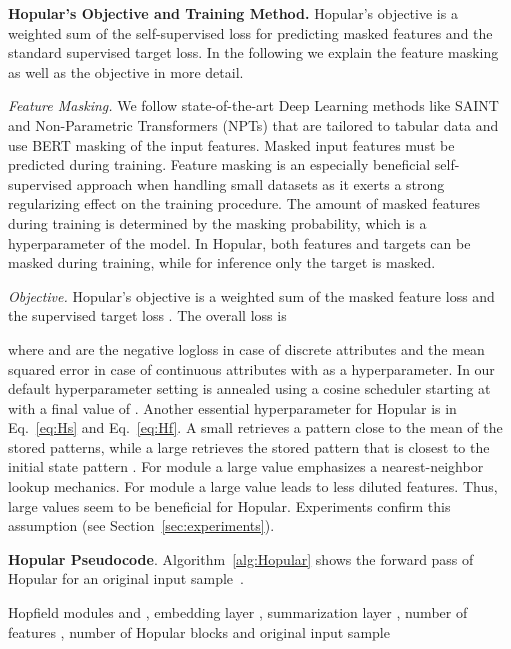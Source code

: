 \documentclass{article}
\theoremstyle{plain}
\theoremstyle{definition}
\theoremstyle{remark}
\begin{document}
{\bf Hopular's Objective and Training Method.}
Hopular's objective is a weighted sum of 
the self-supervised loss for predicting masked features and
the standard supervised target loss.
In the following we explain the feature masking as well as the objective in more detail.

{\em Feature Masking.} 
We follow state-of-the-art Deep Learning methods 
like SAINT \citep{Somepalli:21}
and Non-Parametric Transformers (NPTs) \citep{Kossen:21}
that are tailored to tabular data and 
use BERT masking \citep{Devlin:19} of the input features.
Masked input features must be predicted during training.
Feature masking is an especially beneficial self-supervised approach when 
handling small datasets as it exerts a 
strong regularizing effect on the training procedure. 
The amount of masked features during training is 
determined by the masking probability, which is a hyperparameter of the model.
In Hopular, both features and targets can be masked during training,
while for inference only the target is masked.

{\em Objective.}
Hopular's objective is a weighted sum of the masked 
feature loss  
and the supervised target loss .
The overall loss  is

where  and  are the negative logloss 
in case of discrete attributes and the mean squared error 
in case of continuous attributes with  as a hyperparameter. 
In our default hyperparameter setting  is
annealed using a cosine scheduler starting at  with a final value of .
Another essential hyperparameter for Hopular is  
in Eq.~\eqref{eq:Hs} and Eq.~\eqref{eq:Hf}.
A small  retrieves a pattern close to the mean of
the stored patterns, while a large  
retrieves the stored pattern 
that is closest to the initial state pattern \citep{Ramsauer:21}.
For module  a large  value 
emphasizes a nearest-neighbor lookup mechanics.
For module  a large  value leads to less 
diluted features.
Thus, large  values seem to be beneficial for Hopular.
Experiments confirm this assumption 
(see Section~\ref{sec:experiments}).

{\bf Hopular Pseudocode}. Algorithm~\ref{alg:Hopular} shows the forward pass of Hopular for
an original input sample~.

\begin{algorithm}[h]
   \caption{Forward pass of Hopular}
   \label{alg:Hopular}
\begin{algorithmic}[1]
   \Require Hopfield modules  and , embedding layer ,
   summarization layer , number of features , 
    number of Hopular blocks 
   and original input sample 
   \State 
   \State 
   \State 
   \State 
   \State 
   \State 
   \EndFor
   \State 
\end{algorithmic}
\end{algorithm}
\end{document}
